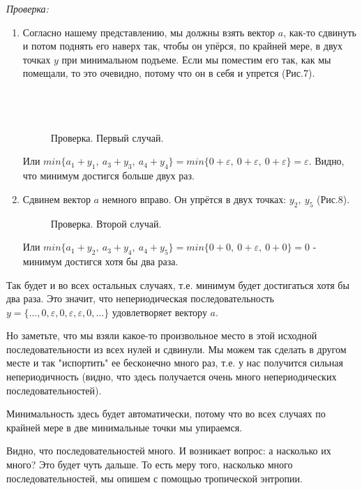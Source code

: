 \documentclass[russian]{lecture-notes}
\begin{document}
\emph{Проверка:}
\begin{enumerate}
 \item
Согласно нашему представлению, мы должны взять вектор $a$, как-то сдвинуть и потом поднять его наверх так, чтобы он упёрся, по крайней мере, в двух точках $y$ при минимальном подъеме. Если мы поместим его так, как мы помещали, то это очевидно, потому что он в себя и упрется (Рис.7).\\\\\\\\

\begin{figure}[h!]
\caption{Проверка. Первый случай.} 
\end{figure}

Или $min\{a_1+y_1,\ a_3+y_3,\ a_4+y_4\}=min\{0+\varepsilon,\ 0+\varepsilon,\ 0+\varepsilon\}=\varepsilon$. Видно, что минимум достигся больше двух раз.
\item
Сдвинем вектор $a$ немного вправо. Он упрётся в двух точках: $y_2,\ y_5$  (Рис.8).
\begin{figure}[h!]
\caption{Проверка. Второй случай.} 
\end{figure}

Или $min\{a_1+y_2,\ a_3+y_4,\ a_4+y_5\}=min\{0+0,\ 0+\varepsilon,\ 0+0\}=0$ - минимум достигся хотя бы два раза.
\end{enumerate}

Так будет и во всех остальных случаях, т.е. минимум будет достигаться хотя бы два раза. Это значит, что непериодическая последовательность  $y=\{\ldots,0,\varepsilon,0,\varepsilon,\varepsilon,0,\ldots\}$ удовлетворяет вектору $a$.

Но заметьте, что мы взяли какое-то произвольное место  в этой исходной последовательности из всех нулей и сдвинули. Мы можем так сделать в другом месте и так "испортить"\: ее бесконечно много раз, т.е. у нас получится сильная непериодичность (видно, что здесь получается очень много непериодических последовательностей).

Минимальность здесь будет автоматически,
потому что во всех случаях по крайней мере в две минимальные точки мы упираемся.

Видно, что последовательностей много. И возникает вопрос: а насколько их много? Это будет чуть дальше. То есть меру того,
насколько много последовательностей, мы опишем с помощью тропической энтропии.
\end{document}
